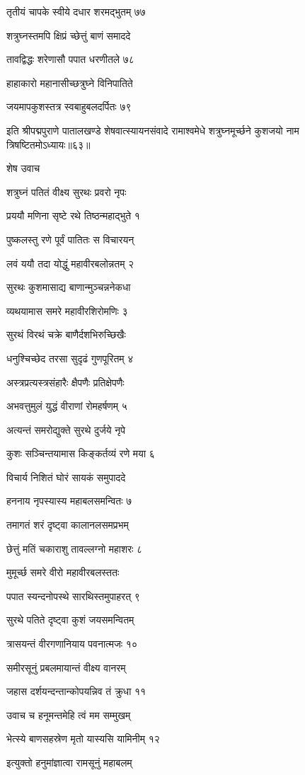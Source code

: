 तृतीयं चापके स्वीये दधार शरमद्भुतम् ७७

शत्रुघ्नस्तमपि क्षिप्रं च्छेत्तुं बाणं समाददे

तावद्विद्धः शरेणासौ पपात धरणीतले ७८

हाहाकारो महानासीच्छत्रुघ्ने विनिपातिते

जयमापकुशस्तत्र स्वबाहुबलदर्पितः ७९

इति श्रीपद्मपुराणे पातालखण्डे शेषवात्स्यायनसंवादे रामाश्वमेधे शत्रुघ्नमूर्च्छने कुशजयो नाम त्रिषष्टितमोऽध्यायः॥६३॥


शेष उवाच

शत्रुघ्नं पतितं वीक्ष्य सुरथः प्रवरो नृपः

प्रययौ मणिना सृष्टे रथे तिष्ठन्महाद्भुते १

पुष्कलस्तु रणे पूर्वं पातितः स विचारयन्

लवं ययौ तदा योद्धुं महावीरबलोन्नतम् २

सुरथः कुशमासाद्य बाणान्मुञ्चन्ननेकधा

व्यथयामास समरे महावीरशिरोमणिः ३

सुरथं विरथं चक्रे बाणैर्दशभिरुच्छिखैः

धनुश्चिच्छेद तरसा सुदृढं गुणपूरितम् ४

अस्त्रप्रत्यस्त्रसंहारैः क्षैपणैः प्रतिक्षेपणैः

अभवत्तुमुलं युद्धं वीराणां रोमहर्षणम् ५

अत्यन्तं समरोद्युक्ते सुरथे दुर्जये नृपे

कुशः सञ्चिन्तयामास किङ्कर्तव्यं रणे मया ६

विचार्य निशितं घोरं सायकं समुपाददे

हननाय नृपस्यास्य महाबलसमन्वितः ७

तमागतं शरं दृष्ट्वा कालानलसमप्रभम्

छेत्तुं मतिं चकाराशु तावल्लग्नो महाशरः ८

मुमूर्च्छ समरे वीरो महावीरबलस्ततः

पपात स्यन्दनोपस्थे सारथिस्तमुपाहरत् ९

सुरथे पतिते दृष्ट्वा कुशं जयसमन्वितम्

त्रासयन्तं वीरगणानियाय पवनात्मजः १०

समीरसूनुं प्रबलमायान्तं वीक्ष्य वानरम्

जहास दर्शयन्दन्तान्कोपयन्निव तं क्रुधा ११

उवाच च हनूमन्तमेहि त्वं मम सम्मुखम्

भेत्स्ये बाणसहस्रेण मृतो यास्यसि यामिनीम् १२

इत्युक्तो हनुमांज्ञात्वा रामसूनुं महाबलम्

